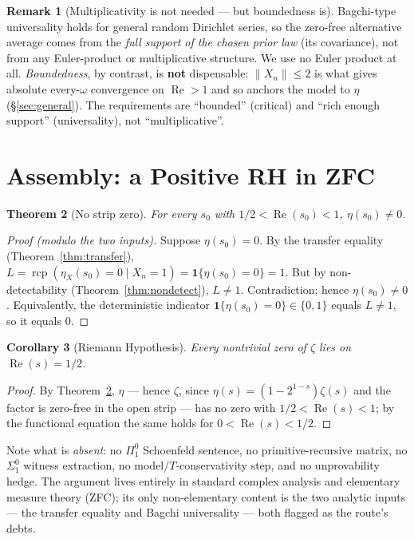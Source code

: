 \documentclass[11pt,a4paper]{article}
\newtheorem{theorem}{Theorem}[section]
\newtheorem{corollary}[theorem]{Corollary}
\theoremstyle{definition}
\newtheorem{remark}[theorem]{Remark}
\newcommand{\Rea}{\operatorname{Re}}
\newcommand{\etaX}{\eta_X}
\newcommand{\rcp}{\operatorname{rcp}}
\begin{document}
\begin{remark}[Multiplicativity is not needed --- but boundedness is]\label{rem:nomult}
Bagchi-type universality holds for general random Dirichlet series, so the zero-free
alternative average comes from the \emph{full support of the chosen prior law} (its
covariance), not from any Euler-product or multiplicative structure. We use no Euler
product at all. \emph{Boundedness}, by contrast, is \textbf{not} dispensable:
\(\|X_n\|\le 2\) is what gives absolute every-\(\omega\) convergence on \(\Rea>1\) and so
anchors the model to \(\eta\) (\S\ref{sec:general}). The requirements are ``bounded''
(critical) and ``rich enough support'' (universality), not ``multiplicative''.
\end{remark}

\section{Assembly: a Positive RH in ZFC}\label{sec:assembly}

\begin{theorem}[No strip zero]\label{thm:nozero}
For every \(s_0\) with \(1/2<\Rea(s_0)<1\), \(\eta(s_0)\neq 0\).
\end{theorem}
\begin{proof}[Proof (modulo the two inputs)]
Suppose \(\eta(s_0)=0\). By the transfer equality (Theorem~\ref{thm:transfer}),
\(L=\rcp(\etaX(s_0)=0\mid X_n=1)=\mathbf{1}\{\eta(s_0)=0\}=1\). But by non-detectability
(Theorem~\ref{thm:nondetect}), \(L\neq 1\). Contradiction; hence \(\eta(s_0)\neq 0\).
Equivalently, the deterministic indicator \(\mathbf{1}\{\eta(s_0)=0\}\in\{0,1\}\) equals
\(L\neq1\), so it equals \(0\).
\end{proof}

\begin{corollary}[Riemann Hypothesis]\label{cor:rh}
Every nontrivial zero of \(\zeta\) lies on \(\Rea(s)=1/2\).
\end{corollary}
\begin{proof}
By Theorem~\ref{thm:nozero}, \(\eta\) --- hence \(\zeta\), since \(\eta(s)=(1-2^{1-s})
\zeta(s)\) and the factor is zero-free in the open strip --- has no zero with
\(1/2<\Rea(s)<1\); by the functional equation the same holds for \(0<\Rea(s)<1/2\).
\end{proof}

Note what is \emph{absent}: no \(\Pi^0_1\) Schoenfeld sentence, no primitive-recursive
matrix, no \(\Sigma^0_1\) witness extraction, no model/\(T\)-conservativity step, and no
unprovability hedge. The argument lives entirely in standard complex analysis and
elementary measure theory (ZFC); its only non-elementary content is the two analytic
inputs --- the transfer equality and Bagchi universality --- both flagged as the route's
debts.
\end{document}
